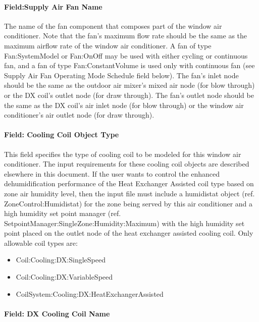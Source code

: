 \paragraph{Field:Supply Air Fan Name}\label{fieldsupply-air-fan-name}

The name of the fan component that composes part of the window air conditioner. Note that the fan's maximum flow rate should be the same as the maximum airflow rate of the window air conditioner. A fan of type Fan:SystemModel or Fan:OnOff may be used with either cycling or continuous fan, and a fan of type Fan:ConstantVolume is used only with continuous fan (see Supply Air Fan Operating Mode Schedule field below). The fan's inlet node should be the same as the outdoor air mixer's mixed air node (for blow through) or the DX coil's outlet node (for draw through). The fan's outlet node should be the same as the DX coil's air inlet node (for blow through) or the window air conditioner's air outlet node (for draw through).

\paragraph{Field: Cooling Coil Object Type}\label{field-cooling-coil-object-type-2-001}

This field specifies the type of cooling coil to be modeled for this window air conditioner. The input requirements for these cooling coil objects are described elsewhere in this document. If the user wants to control the enhanced dehumidification performance of the Heat Exchanger Assisted coil type based on zone air humidity level, then the input file must include a humidistat object (ref. ZoneControl:Humidistat) for the zone being served by this air conditioner and a high humidity set point manager (ref. SetpointManager:SingleZone:Humidity:Maximum) with the high humidity set point placed on the outlet node of the heat exchanger assisted cooling coil. Only allowable coil types are:

\begin{itemize}
\item
  Coil:Cooling:DX:SingleSpeed
\item
  Coil:Cooling:DX:VariableSpeed
\item
  CoilSystem:Cooling:DX:HeatExchangerAssisted
\end{itemize}

\paragraph{Field: DX Cooling Coil Name}\label{field-dx-cooling-coil-name}

